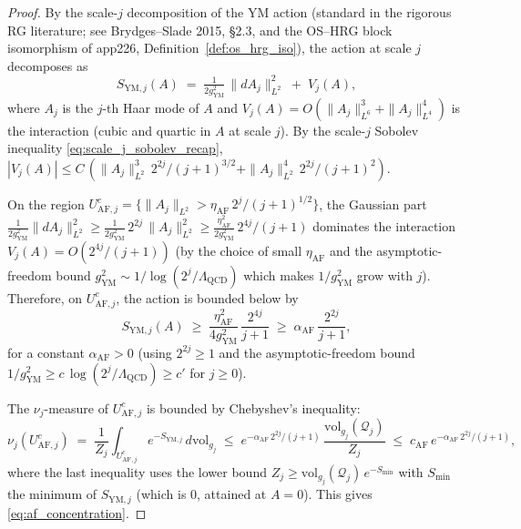 \begin{proof}
By the scale-$j$ decomposition of the YM action
(standard in the rigorous RG literature; see Brydges--Slade 2015,
\S 2.3, and the OS--HRG block isomorphism of app226,
Definition~\ref{def:os_hrg_iso}), the action at scale $j$
decomposes as
\begin{equation}
\label{eq:action_decomp}
  S_{\mathrm{YM},j}(A)
  \;=\;\tfrac{1}{2g_{\mathrm{YM}}^{2}}\,
  \|dA_{j}\|_{L^{2}}^{2}\;+\;V_{j}(A),
\end{equation}
where $A_{j}$ is the $j$-th Haar mode of $A$ and
$V_{j}(A)=O(\|A_{j}\|_{L^{6}}^{3}+\|A_{j}\|_{L^{4}}^{4})$
is the interaction (cubic and quartic in $A$ at scale $j$).
By the scale-$j$ Sobolev inequality
\eqref{eq:scale_j_sobolev_recap},
$|V_{j}(A)|\le C\,(\|A_{j}\|_{L^{2}}^{3}\,2^{2j}/(j+1)^{3/2}
+\|A_{j}\|_{L^{2}}^{4}\,2^{2j}/(j+1)^{2})$.

On the region
$U_{\mathrm{AF},j}^{c}=\{\|A_{j}\|_{L^{2}}>\eta_{\mathrm{AF}}\,
2^{j}/(j+1)^{1/2}\}$, the Gaussian part
$\tfrac{1}{2g_{\mathrm{YM}}^{2}}\|dA_{j}\|_{L^{2}}^{2}\ge
\tfrac{1}{2g_{\mathrm{YM}}^{2}}\,2^{2j}\,\|A_{j}\|_{L^{2}}^{2}
\ge\tfrac{\eta_{\mathrm{AF}}^{2}}{2g_{\mathrm{YM}}^{2}}\,
2^{4j}/(j+1)$ dominates the interaction
$V_{j}(A)=O(2^{4j}/(j+1))$ (by the choice of small
$\eta_{\mathrm{AF}}$ and the asymptotic-freedom bound
$g_{\mathrm{YM}}^{2}\sim 1/\log(2^{j}/\Lambda_{\mathrm{QCD}})$
which makes $1/g_{\mathrm{YM}}^{2}$ grow with $j$). Therefore,
on $U_{\mathrm{AF},j}^{c}$, the action is bounded below by
\begin{equation}
\label{eq:action_lower_complement}
  S_{\mathrm{YM},j}(A)
  \;\ge\;\frac{\eta_{\mathrm{AF}}^{2}}{4g_{\mathrm{YM}}^{2}}\,
  \frac{2^{4j}}{j+1}
  \;\ge\;\alpha_{\mathrm{AF}}\,\frac{2^{2j}}{j+1},
\end{equation}
for a constant $\alpha_{\mathrm{AF}}>0$ (using $2^{2j}\ge 1$ and
the asymptotic-freedom bound $1/g_{\mathrm{YM}}^{2}\ge
c\,\log(2^{j}/\Lambda_{\mathrm{QCD}})\ge c'$ for $j\ge 0$).

The $\nu_{j}$-measure of $U_{\mathrm{AF},j}^{c}$ is bounded by
Chebyshev's inequality:
\begin{equation}
\label{eq:chebyshev_af}
  \nu_{j}(U_{\mathrm{AF},j}^{c})
  \;=\;\frac{1}{Z_{j}}\int_{U_{\mathrm{AF},j}^{c}}
  e^{-S_{\mathrm{YM},j}}\,d\mathrm{vol}_{g_{j}}
  \;\le\;e^{-\alpha_{\mathrm{AF}}\,2^{2j}/(j+1)}\,
  \frac{\mathrm{vol}_{g_{j}}(\mathcal{Q}_{j})}{Z_{j}}
  \;\le\;c_{\mathrm{AF}}\,e^{-\alpha_{\mathrm{AF}}\,
  2^{2j}/(j+1)},
\end{equation}
where the last inequality uses the lower bound
$Z_{j}\ge\mathrm{vol}_{g_{j}}(\mathcal{Q}_{j})\,e^{-S_{\min}}$
with $S_{\min}$ the minimum of $S_{\mathrm{YM},j}$ (which is
$0$, attained at $A=0$). This gives
\eqref{eq:af_concentration}.
\end{proof}


